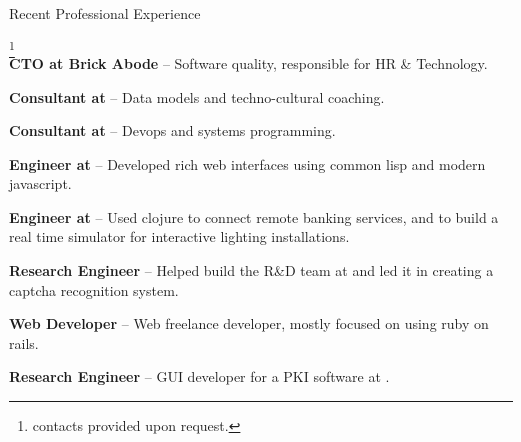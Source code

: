 \begin{rubric}{Recent Professional Experience}{ \footnote{contacts
      provided upon request.}  \\

    \entry*[2016-05 - present] \textbf{CTO at Brick Abode} --
    Software quality, responsible for HR \& Technology.

    \entry*[2015-07 - 2015-12] \textbf{Consultant at
      } --
    Data models and techno-cultural coaching.

    \entry*[2015-05 - 2015-07] \textbf{Consultant at
      } --
    Devops and systems programming.

    \entry*[2013-06 - 2015-02] \textbf{Engineer at
      } --
    Developed rich web interfaces using common lisp and modern javascript.

    \entry*[2012 - 2013-06] \textbf{Engineer at
      } --
    Used clojure to connect remote banking services, and to build a real
    time simulator for interactive lighting installations.

    \entry*[2010 - 2012] \textbf{Research Engineer} -- Helped build
    the R\&D team at 
    and led it in creating a captcha recognition system.

    \entry*[2007-2009] \textbf{Web Developer} -- Web freelance
    developer, mostly focused on using ruby on rails.

    \entry*[2005 - 2007] \textbf{Research Engineer} -- GUI developer
    for a PKI software at .

  }
\end{rubric}
